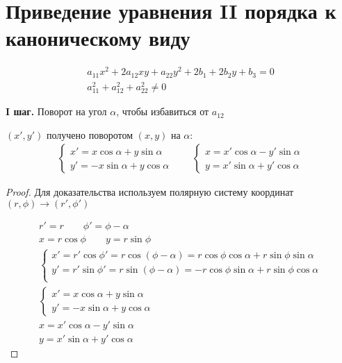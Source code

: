 \documentclass[main]{subfiles}
\begin{document}
\chapter{Приведение уравнения II порядка к каноническому виду}
\begin{gather*}
    a_{11} x^2 + 2 a_{12} xy + a_{22} y^2 + 2b_1 +2b_2y +b_3 = 0\\
    a_{11}^2 + a_{12}^2 + a_{22}^2 \neq 0
\end{gather*}

\textbf{I шаг. } Поворот на угол $\alpha$, чтобы избавиться от $a_{12}$

\begin{theorem}
    $(x', y')$ получено поворотом $(x,y)$ на $\alpha$:
    \begin{gather*}
        \begin{cases}
            x' = x \cos \alpha + y \sin \alpha \\
            y' = - x \sin \alpha + y \cos \alpha
        \end{cases}\qquad
        \begin{cases}
            x = x' \cos \alpha - y' \sin \alpha \\
            y = x' \sin \alpha + y' \cos \alpha
        \end{cases}
    \end{gather*}
\end{theorem}
\begin{proof}
    Для доказательства используем полярную систему координат $(r, \phi) \to (r', \phi')$

    \begin{gather*}
        r' = r \qquad \phi' = \phi - \alpha\\
        x = r \cos \phi \qquad y = r \sin \phi \\
        \begin{cases}
            x' = r' \cos \phi' = r \cos (\phi - \alpha) = r \cos \phi \cos \alpha + r \sin \phi \sin \alpha  \\
            y' = r' \sin \phi' = r \sin (\phi - \alpha) = -r \cos \phi \sin \alpha + r \sin \phi \cos \alpha \\
        \end{cases}\\
        \begin{cases}
            x' = x \cos \alpha + y \sin \alpha \\
            y' = -x \sin \alpha + y \cos \alpha
        \end{cases}\\
        x = x' \cos \alpha - y' \sin \alpha\\
        y = x' \sin \alpha + y' \cos \alpha
    \end{gather*}
\end{proof}
\end{document}

